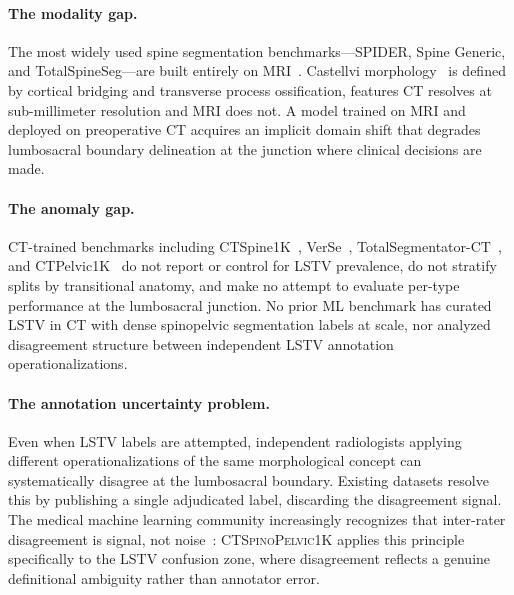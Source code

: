 \documentclass[pmlr]{jmlr}
\newcommand{\dataset}{\textsc{CTSpinoPelvic1K}}
\begin{document}
\paragraph{The modality gap.}
The most widely used spine segmentation benchmarks---SPIDER,
Spine Generic, and TotalSpineSeg---are built entirely on
MRI~\citep{GraafSPIDERBenchmark,Cohen-Adad2021Open-accessManufacturers,Warszawer2025TotalSpineSeg:MRI}.
Castellvi morphology~\citep{Castellvi1984LumbosacralDefects} is defined
by cortical bridging and transverse process ossification, features
CT resolves at sub-millimeter resolution and MRI does not.
A model trained on MRI and deployed on preoperative CT acquires an
implicit domain shift that degrades lumbosacral boundary delineation
at the junction where clinical decisions are made.

\paragraph{The anomaly gap.}
CT-trained benchmarks including
CTSpine1K~\citep{Deng2021CTSpine1K:Tomography},
VerSe~\citep{Sekuboyina2020VerSe:Benchmark},
TotalSegmentator-CT~\citep{Wasserthal2023TotalSegmentator:Images}, and
CTPelvic1K~\citep{Liu2021DeepModels} do not report or control for
LSTV prevalence, do not stratify splits by transitional anatomy,
and make no attempt to evaluate per-type performance at the
lumbosacral junction.
No prior ML benchmark has curated LSTV in CT with dense spinopelvic
segmentation labels at scale, nor analyzed disagreement structure
between independent LSTV annotation operationalizations.

\paragraph{The annotation uncertainty problem.}
Even when LSTV labels are attempted, independent radiologists
applying different operationalizations of the same morphological
concept can systematically disagree at the lumbosacral boundary.
Existing datasets resolve this by publishing a single adjudicated
label, discarding the disagreement signal.
The medical machine learning community increasingly recognizes
that inter-rater disagreement is signal, not
noise~\citep{Dawid1979MaximumAlgorithm}:
\dataset{} applies this principle specifically to the LSTV
confusion zone, where disagreement reflects a genuine definitional
ambiguity rather than annotator error.
\end{document}

